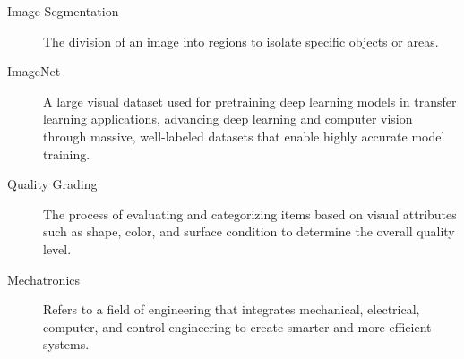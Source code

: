 {\begin{description}
	\item[Image Segmentation] 
	The division of an image into regions to isolate specific objects or areas.
	
	\item[ImageNet] 
	A large visual dataset used for pretraining deep learning models in transfer learning applications, advancing deep learning and computer vision through massive, well-labeled datasets that enable highly accurate model training.
	
	\item[Quality Grading] 
	The process of evaluating and categorizing items based on visual attributes such as shape, color, and surface condition to determine the overall quality level. 
	
	\item[Mechatronics] 
	Refers to a field of engineering that integrates mechanical, electrical, computer, and control engineering to create smarter and more efficient systems.

\end{description}

}
